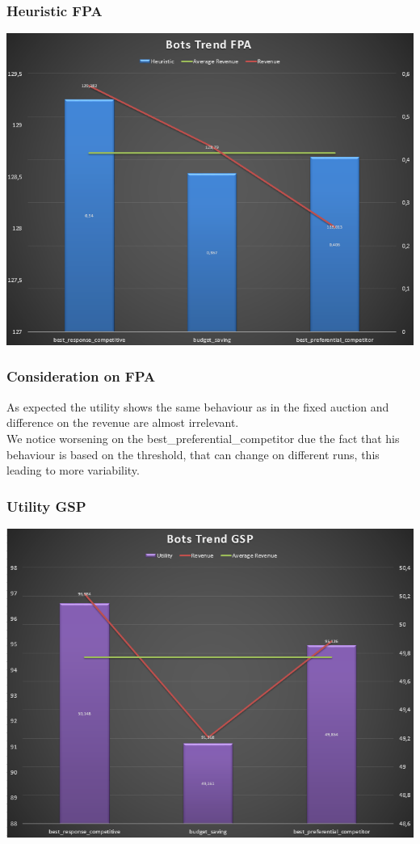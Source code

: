 \documentclass{beamer}
\begin{document}
\begin{frame}
\frametitle{Heuristic FPA}
\begin{center}
\includegraphics[scale=0.46]{img/Auctions/RFPA_all_Heuristic.PNG} 
\end{center}
\end{frame}

\begin{frame}
\frametitle{Consideration on FPA}
As expected the utility shows the \alert{same} behaviour as in the fixed auction and difference on the revenue are almost irrelevant.\\
\medskip
We notice \alert{worsening} on the best\_preferential\_competitor due the fact that his behaviour is based on the threshold, that can change on different runs, this leading to more variability. 
\end{frame}

\begin{frame}
\frametitle{Utility GSP}
\begin{center}
\includegraphics[scale=0.46]{img/Auctions/RGSP_all_Utility.PNG} 
\end{center}
\end{frame}
\end{document}
